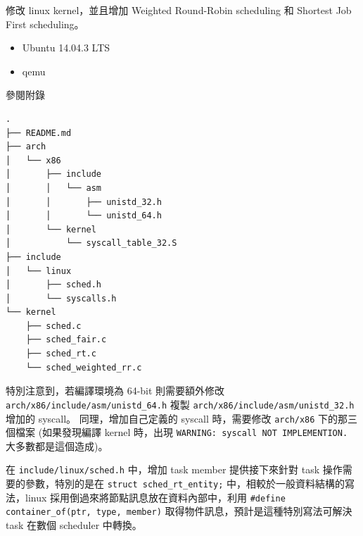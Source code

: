 \documentclass{res}
\begin{document}
 


\address{\\R03922106 蔡佑隆 unzledick@yahoo.com.tw\\ R04922067 楊翔雲 morris821028@gmail.com}

\begin{resume}

\vspace*{.1in} 

修改 linux kernel，並且增加 Weighted Round-Robin scheduling 和 Shortest Job First scheduling。

\vspace*{.1in} 

\begin{itemize}
	\item Ubuntu 14.04.3 LTS
	\item qemu
\end{itemize}


\vspace*{.1in} 

參閱附錄

\vspace*{.1in} 

\begin{lstlisting}[frame=single]
.
├── README.md
├── arch
│   └── x86
│       ├── include
│       │   └── asm
│       │       ├── unistd_32.h
│       │       └── unistd_64.h
│       └── kernel
│           └── syscall_table_32.S
├── include
│   └── linux
│       ├── sched.h
│       └── syscalls.h
└── kernel
    ├── sched.c
    ├── sched_fair.c
    ├── sched_rt.c
    └── sched_weighted_rr.c
\end{lstlisting}

特別注意到，若編譯環境為 64-bit 則需要額外修改 \lstinline{arch/x86/include/asm/unistd_64.h} 複製 \lstinline{arch/x86/include/asm/unistd_32.h} 增加的 syscall。 同理，增加自己定義的 syscall 時，需要修改 \lstinline{arch/x86} 下的那三個檔案 (如果發現編譯 kernel 時，出現 \lstinline{WARNING: syscall NOT IMPLEMENTION.} 大多數都是這個造成)。



在 \lstinline{include/linux/sched.h} 中，增加 task member 提供接下來針對 task 操作需要的參數，特別的是在 \lstinline{struct sched_rt_entity;} 中，相較於一般資料結構的寫法，linux 採用倒過來將節點訊息放在資料內部中，利用 \lstinline{#define container_of(ptr, type, member)} 取得物件訊息，預計是這種特別寫法可解決 task 在數個 scheduler 中轉換。


\end{resume}
\end{document}
